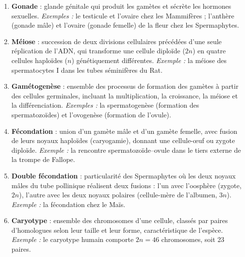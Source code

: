 \documentclass[11pt]{article}
\begin{document}
\begin{corrige}
\begin{enumerate}
\item \textbf{Gonade} : glande génitale qui produit les gamètes et sécrète les hormones sexuelles. \emph{Exemples :} le testicule et l'ovaire chez les Mammifères ; l'anthère (gonade mâle) et l'ovaire (gonade femelle) de la fleur chez les Spermaphytes.
\item \textbf{Méiose} : succession de deux divisions cellulaires précédées d'une seule réplication de l'ADN, qui transforme une cellule diploïde ($2n$) en quatre cellules haploïdes ($n$) génétiquement différentes. \emph{Exemple :} la méiose des spermatocytes I dans les tubes séminifères du Rat.
\item \textbf{Gamétogenèse} : ensemble des processus de formation des gamètes à partir des cellules germinales, incluant la multiplication, la croissance, la méiose et la différenciation. \emph{Exemples :} la spermatogenèse (formation des spermatozoïdes) et l'ovogenèse (formation de l'ovule).
\item \textbf{Fécondation} : union d'un gamète mâle et d'un gamète femelle, avec fusion de leurs noyaux haploïdes (caryogamie), donnant une cellule-\oe uf ou zygote diploïde. \emph{Exemple :} la rencontre spermatozoïde--ovule dans le tiers externe de la trompe de Fallope.
\item \textbf{Double fécondation} : particularité des Spermaphytes où les deux noyaux mâles du tube pollinique réalisent deux fusions : l'un avec l'oosphère (zygote, $2n$), l'autre avec les deux noyaux polaires (cellule-mère de l'albumen, $3n$). \emph{Exemple :} la fécondation chez le Maïs.
\item \textbf{Caryotype} : ensemble des chromosomes d'une cellule, classés par paires d'homologues selon leur taille et leur forme, caractéristique de l'espèce. \emph{Exemple :} le caryotype humain comporte $2n = 46$ chromosomes, soit 23 paires.
\end{enumerate}
\end{corrige}
\end{document}
